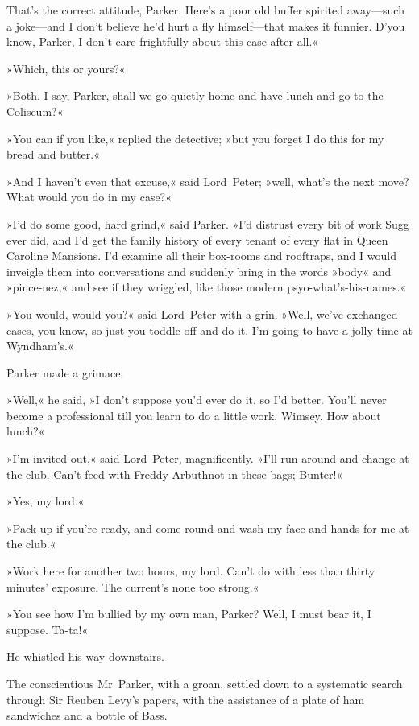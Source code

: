 That's the correct attitude, Parker. Here's a poor old buffer spirited away—such a joke—and I don't believe he'd hurt a fly himself—that makes it funnier. D'you know, Parker, I don't care frightfully about this case after all.«

»Which, this or yours?«

»Both. I say, Parker, shall we go quietly home and have lunch and go to the Coliseum?«

»You can if you like,« replied the detective; »but you forget I do this for my bread and butter.«

»And I haven't even that excuse,« said Lord~Peter; »well, what's the next move? What would you do in my case?«

»I'd do some good, hard grind,« said Parker. »I'd distrust every bit of work Sugg ever did, and I'd get the family history of every tenant of every flat in Queen Caroline Mansions. I'd examine all their box-rooms and rooftraps, and I would inveigle them into conversations and suddenly bring in the words »body« and »pince-nez,« and see if they wriggled, like those modern psyo-what's-his-names.«

»You would, would you?« said Lord~Peter with a grin. »Well, we've exchanged cases, you know, so just you toddle off and do it. I'm going to have a jolly time at Wyndham's.«

Parker made a grimace.

»Well,« he said, »I don't suppose you'd ever do it, so I'd better. You'll never become a professional till you learn to do a little work, Wimsey. How about lunch?«

»I'm invited out,« said Lord~Peter, magnificently. »I'll run around and change at the club. Can't feed with Freddy Arbuthnot in these bags; Bunter!«

»Yes, my lord.«

»Pack up if you're ready, and come round and wash my face and hands for me at the club.«

»Work here for another two hours, my lord. Can't do with less than thirty minutes' exposure. The current's none too strong.«

»You see how I'm bullied by my own man, Parker? Well, I must bear it, I suppose. Ta-ta!«

He whistled his way downstairs.

The conscientious Mr~Parker, with a groan, settled down to a systematic search through Sir Reuben Levy's papers, with the assistance of a plate of ham sandwiches and a bottle of Bass.

